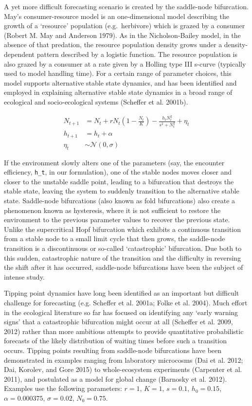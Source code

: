 \documentclass{article}
\begin{document}
A yet more difficult forecasting scenario is created by the saddle-node
bifurcation. May's consumer-resource model is an one-dimensional model
describing the growth of a `resource' population (e.g.~herbivore) which
is grazed by a consumer (Robert M. May and Anderson 1979). As in the
Nicholson-Bailey model, in the absence of that predation, the resource
population density grows under a density-dependent pattern described by
a logistic function. The resource population is also grazed by a
consumer at a rate given by a Holling type III s-curve (typically used
to model handling time). For a certain range of parameter choices, this
model supports alternative stable state dynamics, and has been
identified and employed in explaining alternative stable state dynamics
in a broad range of ecological and socio-ecological systems (Scheffer et
al. 2001b).

\begin{align}
N_{t+1} &= N_t + r N_t \left(1 - \frac{N_t}{K} \right) - \frac{h_t N_t^2}{s^2 + N_t^2} + \eta_t \\
h_{t+1} &= h_t + \alpha \\
\eta_t &\sim \mathcal{N}(0, \sigma)
\end{align}

If the environment slowly alters one of the parameters (say, the
encounter efficiency, \texttt{h\_t}, in our formulation), one of the
stable nodes moves closer and closer to the unstable saddle point,
leading to a bifurcation that destroys the stable state, leaving the
system to suddenly transition to the alternative stable state.
Saddle-node bifurcations (also known as fold bifurcations) also create a
phenomenon known as hysteresis, where it is not sufficient to restore
the environment to the previous parameter values to recover the previous
state. Unlike the supercritical Hopf bifurcation which exhibits a
continuous transition from a stable node to a small limit cycle that
then grows, the saddle-node transition is a discontinuous or so-called
`catastrophic' bifurcation. Due both to this sudden, catastrophic nature
of the transition and the difficulty in reversing the shift after it has
occurred, saddle-node bifurcations have been the subject of intense
study.

Tipping point dynamics have long been identified as an important but
difficult challenge for forecasting (e.g. Scheffer et al. 2001a; Folke
et al. 2004). Much effort in the ecological literature so far has
focused on identifying any `early warning signs' that a catastrophic
bifurcation might occur at all (Scheffer et al. 2009, 2012) rather than
more ambitious attempts to provide quantitative probabilistic forecasts
of the likely distribution of waiting times before such a transition
occurs. Tipping points resulting from saddle-node bifurcations have been
demonstrated in examples ranging from laboratory microcosms (Dai et al.
2012; Dai, Korolev, and Gore 2015) to whole-ecosystem experiments
(Carpenter et al. 2011), and postulated as a model for global change
(Barnosky et al. 2012). Examples use the following parameters:
\(r = 1\), \(K = 1\), \(s = 0.1\), \(h_0 = 0.15\),
\(\alpha = 0.000375\), \(\sigma = 0.02\), \(N_0 = 0.75\).
\end{document}
